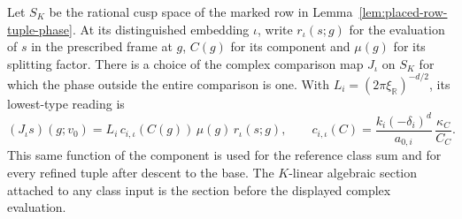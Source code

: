 \begin{auxlemma}
\label{lem:placed-row-reading-phase}
Let \(S_K\) be the rational cusp space of the marked row in
Lemma~\ref{lem:placed-row-tuple-phase}. At its distinguished
embedding \(\iota\), write \(r_\iota(s;g)\) for the evaluation
of \(s\) in the prescribed frame at \(g\), \(C(g)\) for its
component and \(\mu(g)\) for its splitting factor. There is a
choice of the complex comparison map \(J_\iota\) on \(S_K\) for
which the phase outside the entire comparison is one. With
\(L_i=(2\pi\xi_{\mathbb R})^{-d/2}\), its lowest-type reading is
\[
 (J_\iota s)(g;v_0)
      =L_i\,c_{i,\iota}(C(g))\,\mu(g)\,r_\iota(s;g),\qquad
 c_{i,\iota}(C)=\frac{k_i(-\delta_i)^d}{a_{0,i}}\,
                       \frac{\kappa_C}{C_C}.
\]
This same function of the component is used for the reference
class sum and for every refined tuple after descent to the
base. The \(K\)-linear algebraic section attached to any class
input is the section before the displayed complex evaluation.
\end{auxlemma}
